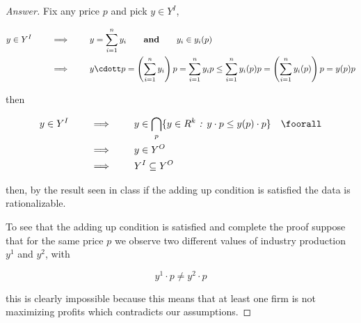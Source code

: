 \documentclass{article}
\theoremstyle{definition}
\newcommand{\qiq}{\qquad \implies \qquad}
\newcommand{\qaq}{\qquad \textbf{and} \qquad}
\newcommand{\settf}{\text{ \emph{:} }}
\begin{document}
\begin{proof}[Answer]
Fix any price $p$ and pick $y\in Y^I$,

\begin{align*}
    y\in Y^I &\qiq y =  \sum_{i=1}^n{y_i} \qaq y_i \in y_i(p)\\
    &\qiq y\cdott p =  \left(  \sum_{i=1}^n{y_i} \right)p =  \sum_{i=1}^n{y_i}p \leq \sum_{i=1}^n{y_i(p)p} = \left(\sum_{i=1}^n{y_i(p)}\right)p = y(p)p\\
\end{align*}

then

\begin{align*}
    y\in Y^I &\qiq y\in \bigcap_{p}\{y\in R^k\settf y\cdot p \leq y(p)\cdot p \} \quad \foorall\\
    &\qiq y \in Y^O\\
    &\qiq Y^I \subseteq Y^O
\end{align*}

then, by the result seen in class if the adding up condition is satisfied the data is rationalizable.

To see that the adding up condition is satisfied and complete the proof suppose that for the same price $p$ we observe two different values of industry production $y^1$ and $y^2$, with

$$ y^1\cdot p \neq y^2\cdot p$$

this is clearly impossible because this means that at least one firm is not maximizing profits which contradicts our assumptions.

\end{proof}
\end{document}

